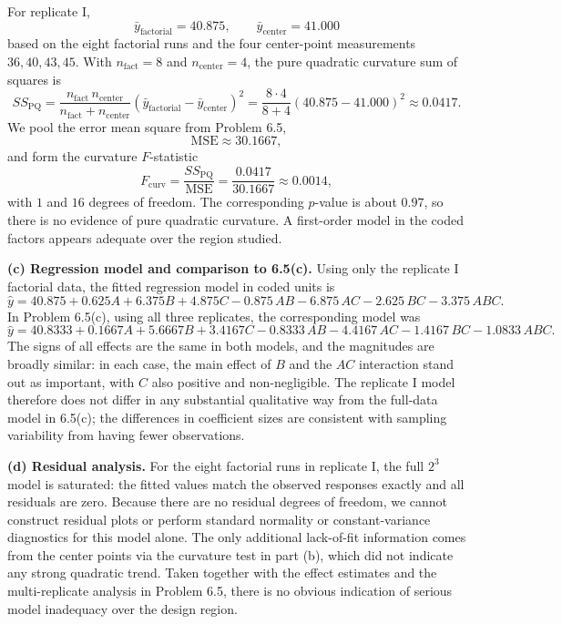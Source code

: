 \documentclass[answers,12pt,addpoints]{exam}
\begin{document}
\begin{solution}
For replicate I,
\[
\bar{y}_{\text{factorial}} = 40.875,\qquad
\bar{y}_{\text{center}} = 41.000
\]
based on the eight factorial runs and the four center-point measurements $36,40,43,45$. With $n_{\text{fact}} = 8$ and $n_{\text{center}} = 4$, the pure quadratic curvature sum of squares is
\[
SS_{\text{PQ}}
= \frac{n_{\text{fact}}\,n_{\text{center}}}{n_{\text{fact}}+n_{\text{center}}}
\left(\bar{y}_{\text{factorial}} - \bar{y}_{\text{center}}\right)^2
= \frac{8 \cdot 4}{8+4}(40.875 - 41.000)^2
\approx 0.0417.
\]
We pool the error mean square from Problem 6.5,
\[
\text{MSE} \approx 30.1667,
\]
and form the curvature $F$-statistic
\[
F_{\text{curv}} = \frac{SS_{\text{PQ}}}{\text{MSE}}
= \frac{0.0417}{30.1667} \approx 0.0014,
\]
with $1$ and $16$ degrees of freedom. The corresponding $p$-value is about $0.97$, so there is no evidence of pure quadratic curvature. A first-order model in the coded factors appears adequate over the region studied.

\medskip
\textbf{(c) Regression model and comparison to 6.5(c).}
Using only the replicate I factorial data, the fitted regression model in coded units is
\[
\hat{y}
= 40.875 + 0.625A + 6.375B + 4.875C
- 0.875\,AB - 6.875\,AC - 2.625\,BC - 3.375\,ABC.
\]
In Problem 6.5(c), using all three replicates, the corresponding model was
\[
\hat{y}
= 40.8333 + 0.1667A + 5.6667B + 3.4167C
- 0.8333\,AB - 4.4167\,AC - 1.4167\,BC - 1.0833\,ABC.
\]
The signs of all effects are the same in both models, and the magnitudes are broadly similar: in each case, the main effect of $B$ and the $AC$ interaction stand out as important, with $C$ also positive and non-negligible. The replicate I model therefore does not differ in any substantial qualitative way from the full-data model in 6.5(c); the differences in coefficient sizes are consistent with sampling variability from having fewer observations.

\medskip
\textbf{(d) Residual analysis.}
For the eight factorial runs in replicate I, the full $2^3$ model is saturated: the fitted values match the observed responses exactly and all residuals are zero. Because there are no residual degrees of freedom, we cannot construct residual plots or perform standard normality or constant-variance diagnostics for this model alone. The only additional lack-of-fit information comes from the center points via the curvature test in part (b), which did not indicate any strong quadratic trend. Taken together with the effect estimates and the multi-replicate analysis in Problem 6.5, there is no obvious indication of serious model inadequacy over the design region.


\end{solution}
\end{document}
